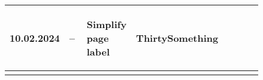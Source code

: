 \begin{tiny}
\begin{longtable}{ | p{0.06\linewidth} | p{0.08\linewidth} | p{0.06\linewidth} | P{0.49\linewidth} | p{0.15\linewidth} | }
        10.02.2024               &
        --                       &
        \begin{tsLTItemize}
            \item Simplify page label
        \end{tsLTItemize}
                                 &
        ThirtySomething            \\
        \hline
    \end{longtable}
\end{tiny}
